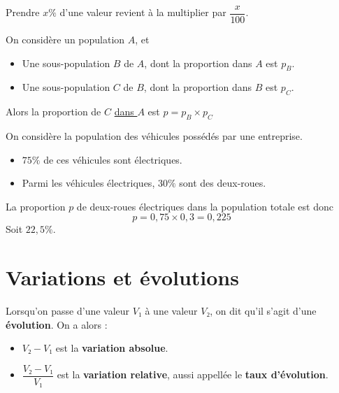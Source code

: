 \documentclass[
	classe=$2^{de}$
]{coursclass}
\begin{document}
\begin{remarque}
	Prendre $x\%$ d'une valeur revient à la multiplier par $\dfrac{x}{100}$.
\end{remarque}

\begin{propriete}
	\begin{center}
	\end{center}

	On considère un population $A$, et
	\begin{itemize}
		\item Une sous-population $B$ de $A$, dont la proportion dans $A$ est $p_B$.
		\item Une sous-population $C$ de $B$, dont la proportion dans $B$ est $p_C$.
	\end{itemize}

	Alors la proportion de $C$ \uline{dans $A$} est $p = p_B × p_C$
\end{propriete}

\begin{exemple}
	On considère la population des véhicules possédés par une entreprise.

	\begin{itemize}
		\item $75\%$ de ces véhicules sont électriques.
		\item Parmi les véhicules électriques, $30\%$ sont des deux-roues.
	\end{itemize}
	La proportion $p$ de deux-roues électriques dans la population totale est donc
	$$ p = 0,75 × 0,3 = 0,225 $$
	Soit $22,5\%$.
\end{exemple}

\section{Variations et évolutions}

\begin{definition}[Variations]
	Lorsqu'on passe d'une valeur $V₁$ à une valeur $V₂$, on dit qu'il s'agit d'une \textbf{évolution}. On a alors :
	\begin{itemize}
		\item $V₂ - V₁$ est la \textbf{variation absolue}.
		\item $\dfrac{V₂ - V₁}{V₁}$ est la \textbf{variation relative}, aussi appellée le \textbf{taux d'évolution}.
	\end{itemize}
\end{definition}
\end{document}
